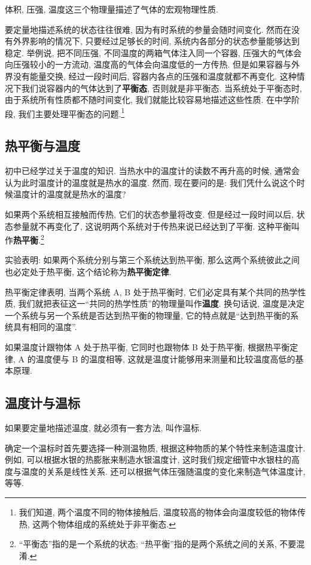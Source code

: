 \documentclass[UTF8,openany,fontset=fandol]{ctexbook}
\theoremstyle{chinesetextbook}
\begin{document}
体积, 压强, 温度这三个物理量描述了气体的宏观物理性质.

要定量地描述系统的状态往往很难, 因为有时系统的参量会随时间变化. 然而在没有外界影响的情况下, 只要经过足够长的时间, 系统内各部分的状态参量能够达到稳定. 举例说, 把不同压强, 不同温度的两箱气体注入同一个容器, 压强大的气体会向压强较小的一方流动, 温度高的气体会向温度低的一方传热. 但是如果容器与外界没有能量交换, 经过一段时间后, 容器内各点的压强和温度就都不再变化. 这种情况下我们说容器内的气体达到了\textbf{平衡态}, 否则就是非平衡态. 当系统处于平衡态时, 由于系统所有性质都不随时间变化, 我们就能比较容易地描述这些性质. 在中学阶段, 我们主要处理平衡态的问题.\footnote{我们知道, 两个温度不同的物体接触后, 温度较高的物体会向温度较低的物体传热, 这两个物体组成的系统处于非平衡态.}
\subsection{热平衡与温度}
初中已经学过关于温度的知识. 当热水中的温度计的读数不再升高的时候, 通常会认为此时温度计的温度就是热水的温度. 然而, 现在要问的是: 我们凭什么说这个时候温度计的温度就是热水的温度?

如果两个系统相互接触而传热, 它们的状态参量将改变. 但是经过一段时间以后, 状态参量就不再变化了, 这说明两个系统对于传热来说已经达到了平衡. 这种平衡叫作\textbf{热平衡}.\footnote{“平衡态”指的是一个系统的状态; “热平衡”指的是两个系统之间的关系, 不要混淆.}

实验表明: 如果两个系统分别与第三个系统达到热平衡, 那么这两个系统彼此之间也必定处于热平衡, 这个结论称为\textbf{热平衡定律}.

热平衡定律表明, 当两个系统 A, B 处于热平衡时, 它们必定具有某个共同的热学性质, 我们就把表征这一“共同的热学性质”的物理量叫作\textbf{温度}. 换句话说, 温度是决定一个系统与另一个系统是否达到热平衡的物理量, 它的特点就是“达到热平衡的系统具有相同的温度”.

如果温度计跟物体 A 处于热平衡, 它同时也跟物体 B 处于热平衡, 根据热平衡定律, A 的温度便与 B 的温度相等, 这就是温度计能够用来测量和比较温度高低的基本原理.
\subsection{温度计与温标}
如果要定量地描述温度, 就必须有一套方法, 叫作温标.

确定一个温标时首先要选择一种测温物质, 根据这种物质的某个特性来制造温度计. 例如, 可以根据水银的热膨胀来制造水银温度计, 这时我们规定细管中水银柱的高度与温度的关系是线性关系. 还可以根据气体压强随温度的变化来制造气体温度计, 等等.
\end{document}
